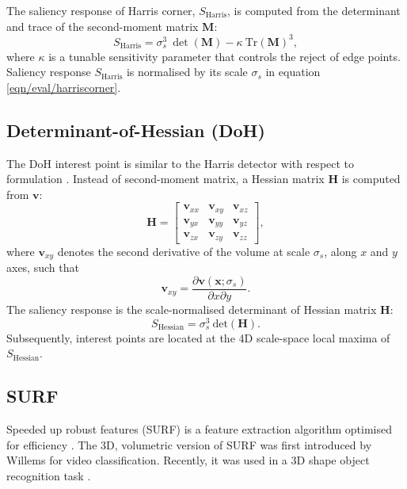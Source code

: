 The saliency response of Harris corner, $S_\textrm{Harris}$, is computed from the determinant and trace of the second-moment matrix $\mathbf{M}$: 
\begin{equation}
	S_\textrm{Harris} = \sigma_{s}^3 \:\det(\mathbf{M}) - \kappa\:\mathrm{Tr(\mathbf{M})}^3,
	\label{eqn/eval/harriscorner}
\end{equation}
where $\kappa$ is a tunable sensitivity parameter that controls the reject of edge points.  
Saliency response $S_\textrm{Harris}$ is normalised by its scale $\sigma_s$ in equation \ref{eqn/eval/harriscorner}.

\subsection{Determinant-of-Hessian (DoH)}
\label{sec/eval/doh}
The DoH interest point is similar to the Harris detector with respect to formulation \cite{Lindeberg1998}. Instead of second-moment matrix, a Hessian matrix $\mathbf{H}$ is computed from $\mathbf{v}$: 
\begin{equation}
	\mathbf{H} = 
	\left[
		\begin{array}{ccc}
			\mathbf{v}_{xx} & \mathbf{v}_{xy} & \mathbf{v}_{xz} \\
			\mathbf{v}_{yx} & \mathbf{v}_{yy} & \mathbf{v}_{yz} \\
			\mathbf{v}_{zx} & \mathbf{v}_{zy} & \mathbf{v}_{zz} 
		\end{array}
	\right],
	\label{eqn/eval/hessianmatrix}
\end{equation}
where $\mathbf{v}_{xy}$ denotes the second derivative of the volume at scale $\sigma_s$, along $x$ and $y$ axes, such that
\begin{equation}
	\mathbf{v}_{xy} = \displaystyle\frac{\partial \mathbf{v}(\mathbf{x};\sigma_s)}{\partial x \partial y}.
	\label{eqn/eval/hessiandiverative}
\end{equation}
The saliency response is the scale-normalised determinant of Hessian matrix $\mathbf{H}$:
\begin{equation}
	S_{\textrm{Hessian}} = \sigma^3_s \:\mathrm{det}(\mathbf{H}).
	\label{eqn/eval/hessiansaliency}
\end{equation}
Subsequently, interest points are located at the 4D scale-space local maxima of $S_\textrm{Hessian}$.

\subsection{SURF}
Speeded up robust features (SURF) is a feature extraction algorithm optimised for efficiency \cite{Bay2008}. The 3D, volumetric version of SURF was first introduced by Willems \etal \cite{Willems2008} for video classification. Recently, it was used in a 3D shape object recognition task \cite{Knopp2010}.

